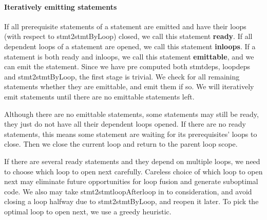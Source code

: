 \documentclass[sigplan, nonacm]{acmart}\settopmatter{printfolios=true,printccs=false,printacmref=false}
\begin{document}
\paragraph*{Iteratively emitting statements} If all prerequisite statements of a statement are emitted and have their loops (with respect to stmt2stmtByLoop) closed, we call this statement \textbf{ready}. If all dependent loops of a statement are opened, we call this statement \textbf{inloops}. If a statement is both ready and inloops, we call this statement \textbf{emittable}, and we can emit the statement. Since we have pre computed both stmtdeps, loopdeps and stmt2stmtByLoop, the first stage is trivial. We check for all remaining statements whether they are emittable, and emit them if so. We will iteratively emit statements until there are no emittable statements left.\par
Although there are no emittable statements, some statements may still be ready, they just do not have all their dependent loops opened. If there are no ready statements, this means some statement are waiting for its prerequisites' loops to close. Then we close the current loop and return to the parent loop scope.\par
 If there are several ready statements and they depend on multiple loops, we need to choose which loop to open next carefully. Careless choice of which loop to open next may eliminate future opportunities for loop fusion and generate suboptimal code. We also may take stmt2stmtloopAfterloop in to consideration, and avoid closing a loop halfway due to stmt2stmtByLoop, and reopen it later. To pick the optimal loop to open next, we use a greedy heuristic.\par
\end{document}
